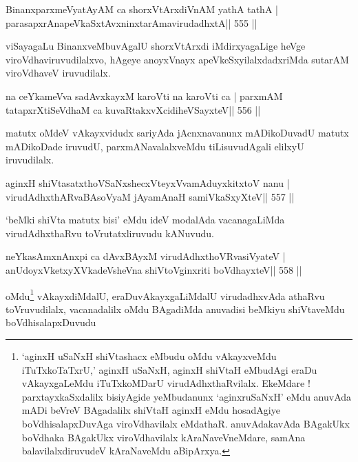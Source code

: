 
\begin{shl}
BinanxparxmeVyatAyAM ca shorxVtArxdiVnAM yathA tathA |
parasapxrAnapeVkaSxtAvxninxtarAmavirudadhxtA\hfill || 555 ||
\end{shl}

\begin{artha}
viSayagaLu BinanxveMbuvAgalU shorxVtArxdi iMdirxyagaLige heVge viroVdhaviruvudilalxvo, hAgeye anoyxVnayx apeVkeSxyilalxdadxriMda sutarAM viroVdhaveV iruvudilalx.
\end{artha}

\begin{shl}
na ceYkameVva sadAvxkayxM karoVti na karoVti ca |
parxmAM tatapxrXtiSeVdhaM ca kuvaRtakxvXcidiheVSayxteV\hfill || 556 ||
\end{shl}

\begin{artha}
matutx oMdeV vAkayxvidudx sariyAda jAcnxnavanunx mADikoDuvadU matutx mADikoDade iruvudU, parxmANavalalxveMdu tiLisuvudAgali elilxyU iruvudilalx.
\end{artha}



\begin{shl}
aginxH shiVtasatxthoVSaNxshecxVteyxVvamAduyxkitxtoV nanu |
virudAdhxthARvaBAsoV\s yaM jAyamAnaH samiVkaSxyXteV\hfill || 557 ||
\end{shl}

\begin{artha}
`beMki shiVta matutx bisi' eMdu ideV modalAda vacanagaLiMda
  virudAdhxthaRvu toVrutatxliruvudu kANuvudu.

\end{artha}

\begin{shl}
neYkasAmxnAnxpi ca dAvxBAyxM virudAdhxthoVR\s vasiVyateV |
anUdoyxVketxyXVkadeVsheVna shiVtoV\s ginxriti boVdhayxteV\hfill || 558 ||
\end{shl}



\begin{artha}
oMdu\footnote{`aginxH uSaNxH shiVtashacx eMbudu oMdu
  vAkayxveMdu iTuTxkoTaTxrU,' aginxH uSaNxH, aginxH shiVtaH eMbudAgi
  eraDu vAkayxgaLeMdu iTuTxkoMDarU virudAdhxthaRvilalx. EkeMdare !
  parxtayxkaSxdalilx bisiyAgide yeMbudanunx `aginxruSaNxH' eMdu
  anuvAda mADi beVreV BAgadalilx shiVtaH aginxH eMdu hosadAgiye
  boVdhisalapxDuvAga viroVdhavilalx eMdathaR. anuvAdakavAda BAgakUkx
  boVdhaka BAgakUkx viroVdhavilalx kAraNaveVneMdare,
  samAna balavilalxdiruvudeV kAraNaveMdu aBipArxya.} vAkayxdiMdalU, 
  eraDu\footnotemark[\thefootnote]
  vAkayxgaLiMdalU
virudadhxvAda athaRvu toVruvudilalx, vacanadalilx oMdu BAgadiMda
anuvadisi beMkiyu shiVtaveMdu boVdhisalapxDuvudu
\end{artha}


